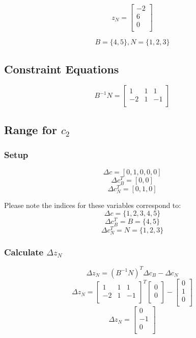 \documentclass[14pt]{extarticle}
\begin{document}
\[
    z_N = \begin{bmatrix}
        -2 \\
        6 \\
        0 \\
    \end{bmatrix}
\]

\[
    B = \{4, 5\}, N = \{1, 2, 3\}
\]

\subsection*{Constraint Equations}
\[
    B^{-1}N = \begin{bmatrix}
        1 & 1 & 1 \\
        -2 & 1 & -1 \\
    \end{bmatrix}
\]

\subsection*{Range for $c_2$}
\subsubsection*{Setup}
\[
    \Delta c = [0, 1, 0, 0, 0]
\]
\[
    \Delta c^T_B = [0, 0]
\]
\[
    \Delta c^T_N = [0, 1, 0]
\]

\bigskip Please note the indices for these variables correspond to:
\[
    \Delta c = \{1, 2, 3, 4, 5\}
\]
\[
    \Delta c^T_B = B = \{4, 5\}
\]
\[
    \Delta c^T_N = N = \{1, 2, 3\}
\]

\subsubsection*{Calculate $\Delta z_N$}
\[
    \Delta z_N = (B^{-1}N)^T \Delta c_B - \Delta c_N
\]
\[
    \Delta z_N = \begin{bmatrix}
        1 & 1 & 1 \\
        -2 & 1 & -1 \\
    \end{bmatrix}^T
    \begin{bmatrix}
        0 \\
        0 \\
    \end{bmatrix}
    - \begin{bmatrix}
        0 \\
        1 \\
        0 \\
    \end{bmatrix}
\]
\[
    \Delta z_N = \begin{bmatrix}
        0 \\
        -1 \\
        0 \\
    \end{bmatrix}
\]
\end{document}
